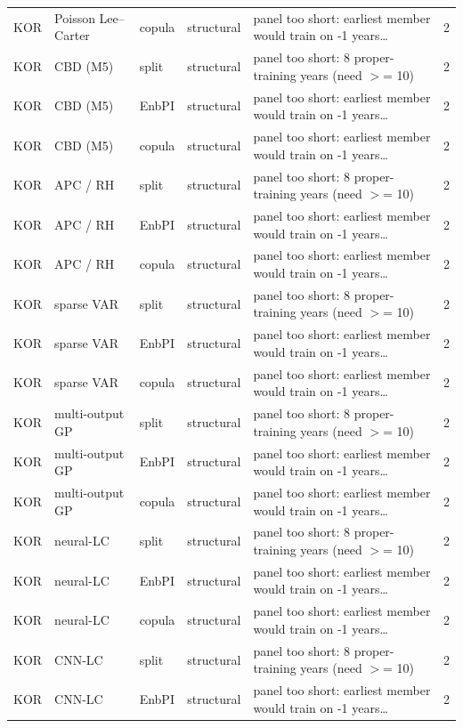 {\begin{longtable}{@{}lllp{1.6cm}p{6.2cm}r@{}}
KOR & Poisson Lee--Carter & copula & structural & panel too short: earliest member would train on -1 years\ldots & 2 \\
KOR & CBD (M5) & split & structural & panel too short: 8 proper-training years (need $>$= 10) & 2 \\
KOR & CBD (M5) & EnbPI & structural & panel too short: earliest member would train on -1 years\ldots & 2 \\
KOR & CBD (M5) & copula & structural & panel too short: earliest member would train on -1 years\ldots & 2 \\
KOR & APC / RH & split & structural & panel too short: 8 proper-training years (need $>$= 10) & 2 \\
KOR & APC / RH & EnbPI & structural & panel too short: earliest member would train on -1 years\ldots & 2 \\
KOR & APC / RH & copula & structural & panel too short: earliest member would train on -1 years\ldots & 2 \\
KOR & sparse VAR & split & structural & panel too short: 8 proper-training years (need $>$= 10) & 2 \\
KOR & sparse VAR & EnbPI & structural & panel too short: earliest member would train on -1 years\ldots & 2 \\
KOR & sparse VAR & copula & structural & panel too short: earliest member would train on -1 years\ldots & 2 \\
KOR & multi-output GP & split & structural & panel too short: 8 proper-training years (need $>$= 10) & 2 \\
KOR & multi-output GP & EnbPI & structural & panel too short: earliest member would train on -1 years\ldots & 2 \\
KOR & multi-output GP & copula & structural & panel too short: earliest member would train on -1 years\ldots & 2 \\
KOR & neural-LC & split & structural & panel too short: 8 proper-training years (need $>$= 10) & 2 \\
KOR & neural-LC & EnbPI & structural & panel too short: earliest member would train on -1 years\ldots & 2 \\
KOR & neural-LC & copula & structural & panel too short: earliest member would train on -1 years\ldots & 2 \\
KOR & CNN-LC & split & structural & panel too short: 8 proper-training years (need $>$= 10) & 2 \\
KOR & CNN-LC & EnbPI & structural & panel too short: earliest member would train on -1 years\ldots & 2 \\

\end{longtable}}
